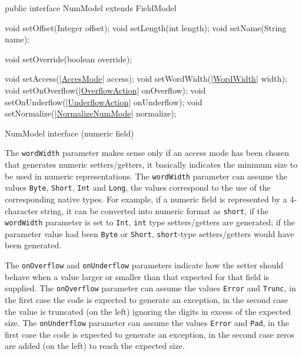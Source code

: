 \documentclass[a4paper,10pt]{report}
\newenvironment{elisting}[1][H]
  {\captionsetup{aboveskip=0pt}\begin{listing}[#1]}
  {\end{listing}%
}
\begin{document}
\begin{elisting}[!htb]
\begin{javacode}
public interface NumModel extends FieldModel {
    void setOffset(Integer offset);
    void setLength(int length);
    void setName(String name);

    void setOverride(boolean override);

    void setAccess(|\hyperref[lst:AccesMode]{AccesMode}| access);
    void setWordWidth(|\hyperref[lst:WordWidth]{WordWidth}| width);
    void setOnOverflow(|\hyperref[lst:OverflowAction]{OverflowAction}| onOverflow);
    void setOnUnderflow(|\hyperref[lst:UnderflowAction]{UnderflowAction}| onUnderflow);
    void setNormalize(|\hyperref[lst:NormalizeNumMode]{NormalizeNumMode}| normalize);
}
\end{javacode}
\caption{NumModel interface (numeric field)}
\label{lst:NumModel}
\end{elisting}

The \verb!wordWidth! parameter makes sense only if an access mode has been 
chosen that generates numeric setters/getters, it basically indicates the 
minimum size to be used in numeric representations. 
The \verb!wordWidth! parameter can assume the values \verb!Byte!, \verb!Short!, 
\verb!Int! and \verb!Long!, the values correspond to the use of the 
corresponding native types. 
For example, if a numeric field is represented by a 4-character string, it can 
be converted into numeric format as \verb!short!, if the \verb!wordWidth! 
parameter is set to \verb!Int!, \verb!int! type setters/getters are generated; 
if the parameter value had been \verb!Byte! or \verb!Short!, \verb!short!-type 
setters/getters would have been generated.

The \verb!onOverflow! and \verb!onUnderflow! parameters indicate how the setter 
should behave when a value larger or smaller than that expected for that field 
is supplied. 
The \verb!onOverflow! parameter can assume the values \verb!Error! and 
\verb!Trunc!, in the first case the code is expected to generate an exception, 
in the second case the value is truncated (on the left) ignoring the digits in 
excess of the expected size. 
The \verb!onUnderflow! parameter can assume the values \verb!Error! and 
\verb!Pad!, in the first case the code is expected to generate an exception, in 
the second case zeros are added (on the left) to reach the expected size.
\end{document}
